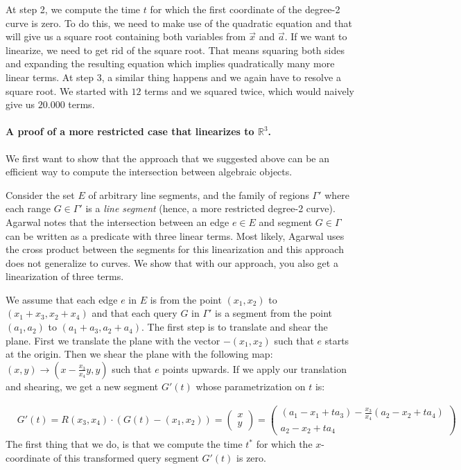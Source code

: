 \documentclass[UKenglish]{lipics-v2019}
\begin{document}
At step 2, we compute the time $t$ for which the first coordinate of the degree-2 curve is zero. To do this, we need to make use of the quadratic equation and that will give us a square root containing both variables from $\vec{x}$ and $\vec{a}$. If we want to linearize, we need to get rid of the square root. That means squaring both sides and expanding the resulting equation which implies quadratically many more linear terms. At step 3, a similar thing happens and we again have to resolve a square root. We started with $12$ terms and we squared twice, which would naively give us $20.000$ terms.



\paragraph*{A proof of a more restricted case that linearizes to $\mathbb{R}^3$.}
We first want to show that the approach that we suggested above can be an efficient way to compute the intersection between algebraic objects. %

Consider the set $E$ of arbitrary line segments, and the family of regions $\Gamma'$ where each range $G \in \Gamma'$ is a \emph{line segment} (hence, a more restricted degree-2 curve). Agarwal notes \cite{agarwal1996range} that the intersection between an edge $e \in E$ and segment $G \in \Gamma$ can be written as a predicate with three linear terms. Most likely, Agarwal uses the cross product between the segments for this linearization and this approach does not generalize to curves. We show that with our approach, you also get a linearization of three terms. 

We assume that each edge $e$ in $E$ is from the point $(x_1, x_2)$ to $(x_1 + x_3, x_2 + x_4)$ and that each query $G$ in $\Gamma'$ is a segment from the point $(a_1, a_2)$ to $(a_1 + a_3, a_2 + a_4)$. The first step is to translate and shear the plane.
First we translate the plane with the vector $-(x_1, x_2)$ such that $e$ starts at the origin. Then we shear the plane with the following map: $(x,y) \rightarrow (x - \frac{x_3}{x_4}y, y)$ such that $e$ points upwards. 
If we apply our translation and shearing, we get a new segment $G'(t)$ whose parametrization on $t$ is:

\begin{align*}
    &G'(t) = R(x_3, x_4) \cdot (G(t) - (x_1, x_2)) =  
    \left( \begin{array}{c}
         x  \\
         y 
    \end{array} \right) =
    \left( \begin{array}{c}
         (a_1 - x_1 + t a_3) - \frac{x_3}{x_4}(a_2 - x_2 + t a_4 )  \\
         a_2 - x_2 + t a_4 
    \end{array} \right)
\end{align*}
The first thing that we do, is that we compute the time $t^*$ for which the $x$-coordinate of this transformed query segment $G'(t)$ is zero.
\end{document}
